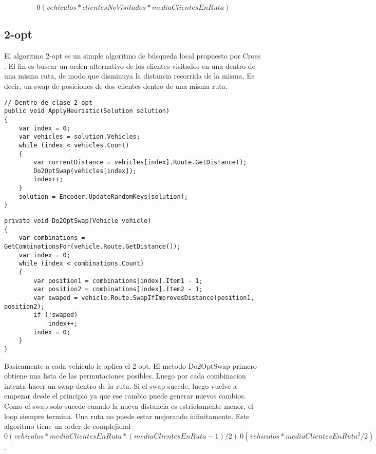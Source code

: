\begin{equation*}
0(vehiculos * clientesNoVisitados * mediaClientesEnRuta)
\end{equation*}

\subsection{2-opt}

El algoritmo 2-opt es un simple algoritmo de búsqueda local propuesto por Croes \cite{Croes}. El fin es buscar un orden alternativo de los clientes visitados en una dentro de una misma ruta, de modo que disminuya la distancia recorrida de la misma. Es decir, un swap de posiciones de dos clientes dentro de una misma ruta.

\begin{minipage}{\textwidth}
\begin{lstlisting}
// Dentro de clase 2-opt
public void ApplyHeuristic(Solution solution)
{
	var index = 0;
	var vehicles = solution.Vehicles;	
	while (index < vehicles.Count)
	{
		var currentDistance = vehicles[index].Route.GetDistance();
		Do2OptSwap(vehicles[index]);
		index++;
	}
	solution = Encoder.UpdateRandomKeys(solution);
}
\end{lstlisting}
\end{minipage}

\begin{minipage}{\textwidth}
\begin{lstlisting}
private void Do2OptSwap(Vehicle vehicle)
{
	var combinations = GetCombinationsFor(vehicle.Route.GetDistance());
	var index = 0;
	while (index < combinations.Count)
	{
		var position1 = combinations[index].Item1 - 1;
		var position2 = combinations[index].Item2 - 1;
		var swaped = vehicle.Route.SwapIfImprovesDistance(position1, position2);
		if (!swaped)
			index++;
		index = 0;
	}
}
\end{lstlisting}
\end{minipage}

\bigskip

Basicamente a cada vehículo le aplica el 2-opt. El metodo Do2OptSwap primero obtiene una lista de las permutaciones posibles. Luego por cada combinacion intenta hacer un swap dentro de la ruta. Si el swap sucede, luego vuelve a empezar desde el principio ya que ese cambio puede generar nuevos cambios. Como el swap solo sucede cuando la nueva distancia es estrictamente menor, el loop siempre termina. Una ruta no puede estar mejorando infinitamente. Este algoritmo tiene un order de complejidad $0(vehiculos * mediaClientesEnRuta  * (mediaClientesEnRuta - 1) / 2) ~ 0 (vehiculos * mediaClientesEnRuta^2 / 2)$.

